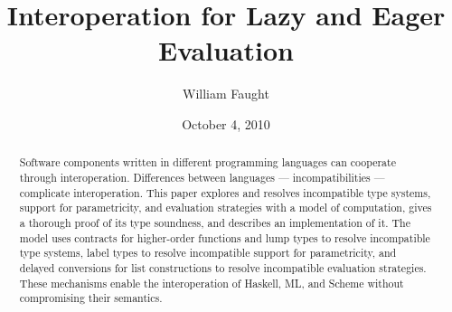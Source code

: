 \documentclass[12pt]{article}
\begin{document}
\title{Interoperation for Lazy and Eager Evaluation}
\author{William Faught}
\date{October 4, 2010}
\maketitle

\begin{abstract}
Software components written in different programming languages can cooperate through interoperation.  Differences between languages --- incompatibilities --- complicate interoperation.  This paper explores and resolves incompatible type systems, support for parametricity, and evaluation strategies with a model of computation, gives a thorough proof of its type soundness, and describes an implementation of it.  The model uses contracts for higher-order functions and lump types to resolve incompatible type systems, label types to resolve incompatible support for parametricity, and delayed conversions for list constructions to resolve incompatible evaluation strategies.  These mechanisms enable the interoperation of Haskell, ML, and Scheme without compromising their semantics.
\end{abstract}






\clearpage

\nocite{*}


\end{document}
